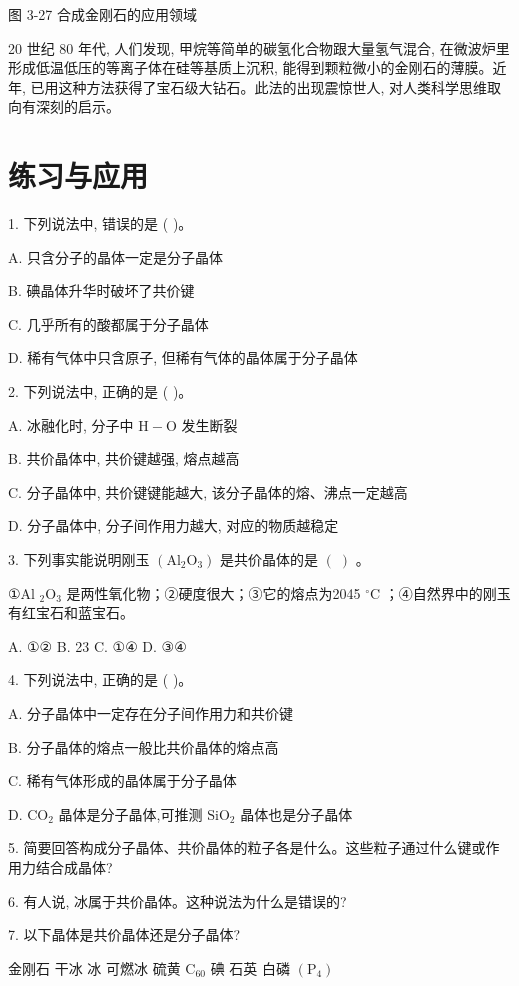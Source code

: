 \documentclass[10pt]{article}
\begin{document}
图 3-27 合成金刚石的应用领域

20 世纪 80 年代, 人们发现, 甲烷等简单的碳氢化合物跟大量氢气混合, 在微波炉里形成低温低压的等离子体在硅等基质上沉积, 能得到颗粒微小的金刚石的薄膜。近年, 已用这种方法获得了宝石级大钻石。此法的出现震惊世人, 对人类科学思维取向有深刻的启示。

\section*{练习与应用}

1. 下列说法中, 错误的是 ( )。

A. 只含分子的晶体一定是分子晶体

B. 碘晶体升华时破坏了共价键

C. 几乎所有的酸都属于分子晶体

D. 稀有气体中只含原子, 但稀有气体的晶体属于分子晶体

2. 下列说法中, 正确的是 ( )。

A. 冰融化时, 分子中 \(\mathrm{H} - \mathrm{O}\) 发生断裂

B. 共价晶体中, 共价键越强, 熔点越高

C. 分子晶体中, 共价键键能越大, 该分子晶体的熔、沸点一定越高

D. 分子晶体中, 分子间作用力越大, 对应的物质越稳定

3. 下列事实能说明刚玉 \(\left( {{\mathrm{{Al}}}_{2}{\mathrm{O}}_{3}}\right)\) 是共价晶体的是 \(\left( \;\right)\) 。

①Al \({}_{2}{\mathrm{O}}_{3}\) 是两性氧化物；②硬度很大；③它的熔点为2045 \({}^{ \circ }\mathrm{C}\) ；④自然界中的刚玉有红宝石和蓝宝石。

A. ①② B. 23 C. ①④ D. ③④

4. 下列说法中, 正确的是 ( )。

A. 分子晶体中一定存在分子间作用力和共价键

B. 分子晶体的熔点一般比共价晶体的熔点高

C. 稀有气体形成的晶体属于分子晶体

D. \({\mathrm{{CO}}}_{2}\) 晶体是分子晶体,可推测 \({\mathrm{{SiO}}}_{2}\) 晶体也是分子晶体

5. 简要回答构成分子晶体、共价晶体的粒子各是什么。这些粒子通过什么键或作用力结合成晶体?

6. 有人说, 冰属于共价晶体。这种说法为什么是错误的?

7. 以下晶体是共价晶体还是分子晶体?

金刚石 干冰 冰 可燃冰 硫黄 \({\mathrm{C}}_{60}\) 碘 石英 白磷 \(\left( {\mathrm{P}}_{4}\right)\)
\end{document}
